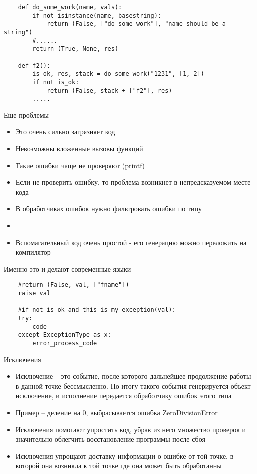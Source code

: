\documentclass{article}
\begin{document}
\begin{lstlisting}
	def do_some_work(name, vals):
		if not isinstance(name, basestring):
			return (False, ["do_some_work"], "name should be a string")
		#......
		return (True, None, res)

	def f2():
		is_ok, res, stack = do_some_work("1231", [1, 2])
		if not is_ok:
			return (False, stack + ["f2"], res)
		.....
\end{lstlisting}
\newpage

\begin{center} Еще проблемы \end{center}
\begin{itemize}
	\item Это очень сильно загрязняет код
	\item Невозможны вложенные вызовы функций
	\item Такие ошибки чаще не проверяют (printf)
	\item Если не проверить ошибку, то проблема 
			возникнет в непредсказуемом месте кода
	\item В обработчиках ошибок нужно фильтровать ошибки по типу
	\item
	\item Вспомагательный код очень простой - его 
		  генерацию можно переложить на компилятор
\end{itemize}
\newpage

\begin{center} Именно это и делают современные языки \end{center}
\begin{lstlisting}
	#return (False, val, ["fname"])
	raise val

	#if not is_ok and this_is_my_exception(val):
	try:
		code
	except ExceptionType as x:
		error_process_code
\end{lstlisting}
\newpage

\begin{center} Исключения \end{center}
\begin{itemize}
	\item Исключение – это событие, после которого дальнейшее продолжение 
			работы в данной точке бессмысленно. По итогу такого события 
			генерируется объект-исключение, и исполнение передается обработчику 
			ошибок этого типа
	\item Пример – деление на 0, выбрасывается ошибка ZeroDivisionError
	\item Исключения помогают упростить код, убрав из него множество 
			проверок и значительно облегчить восстановление программы после сбоя
	\item Исключения упрощают доставку информации о ошибке от той точке, 
			в которой она возникла к той точке где она может быть обработанны
\end{itemize}
\newpage
\end{document}
